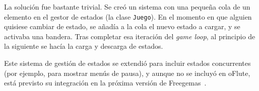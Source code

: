 \label{sec:resolucion_problema_estados}

La solución fue bastante trivial. Se creó un sistema con una pequeña cola de un
elemento en el gestor de estados (la clase \texttt{Juego}). En el momento en que
alguien quisiese cambiar de estado, se añadía a la cola el nuevo estado a
cargar, y se activaba una bandera. Tras completar esa iteración del \textit{game
  loop}, al principio de la siguiente se hacía la carga y descarga de estados.

Este sistema de gestión de estados se extendió para incluir estados concurrentes
(por ejemplo, para mostrar menús de pausa), y aunque no se incluyó en oFlute,
está previsto su integración en la próxima versión de Freegemas~\cite{freegemas}.

